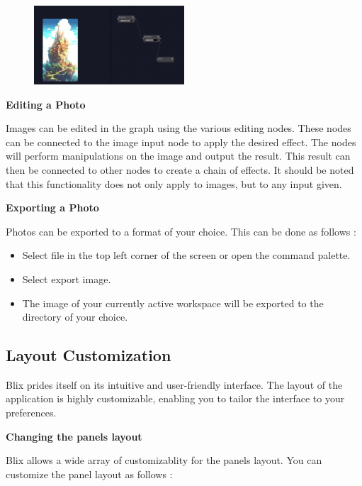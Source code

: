 \documentclass[11pt,a4paper]{article}
\begin{document}
\begin{figure}[H]
  \centering
  \href{https://www.youtube.com/watch?v=ak3Bto3phqk}
  {\includegraphics[width=0.5\textwidth]{../pics/nodes.png}}
\end{figure}


\textbf{Editing a Photo}

Images can be edited in the graph using the various editing nodes. These nodes can be connected to the image input node to apply the desired effect.
The nodes will perform manipulations on the image and output the result. This result can then be connected to other nodes to create a chain of effects.
It should be noted that this functionality does not only apply to images, but to any input given.

\textbf{Exporting a Photo}

Photos can be exported to a format of your choice. This can be done as follows :

\begin{itemize}
  \item[\textbullet] Select file in the top left corner of the screen or open the command palette.
  \item[\textbullet] Select export image.
  \item[\textbullet] The image of your currently active workspace will be exported to the directory of your choice.
\end{itemize}

\subsection*{Layout Customization}

Blix prides itself on its intuitive and user-friendly interface. The layout of the application is highly customizable, enabling you to tailor the interface to your preferences.

\textbf{Changing the panels layout}

Blix allows a wide array of customizablity for the panels layout. You can customize the panel layout as follows :
\end{document}
